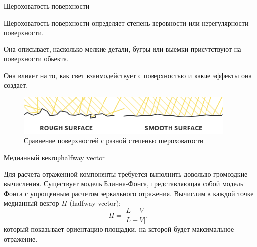 \documentclass{beamer}
\begin{document}
	\begin{frame}{Шероховатость поверхности}

		Шероховатость поверхности определяет степень неровности или нерегулярности поверхности. 
		
		Она описывает, насколько мелкие детали, бугры или выемки присутствуют на поверхности объекта.
		
		Она влияет на то, как свет взаимодействует с поверхностью и какие эффекты она создает. 



		\begin{figure}
			\includegraphics[width=0.95\textwidth]{images/rough_and_smooth_surfaces.png}
			\caption{Сравнение поверхностей с разной степенью шероховатости}
		\end{figure}


	\end{frame}





	\begin{frame}{Медианный вектор}{halfway vector}
		
		Для расчета отраженной компоненты требуется выполнить довольно громоздкие вычисления. Существует модель Блинна-Фонга, представляющая собой модель Фонга с упрощенным расчетом зеркального отражения. Вычислим в каждой точке медианный вектор ${H}$ (halfway vector):
		\[
			H=\frac{L+V}{|L+V|}
			,
		\]
		который показывает ориентацию площадки, на которой будет максимальное отражение. 
	\end{frame}
\end{document}
